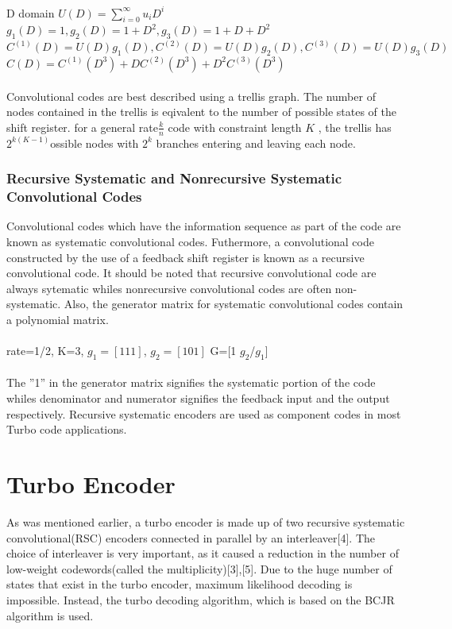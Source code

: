 \documentclass[20 pts]{article}
\begin{document}
\paragraph{}
D domain\newline
$U(D)=\sum_{i=0}^{\infty} u_iD^i $\newline
$g_1(D)=1,g_2(D)=1+D^2,g_3(D)=1+D+D^2$\newline
$C^{(1)}(D)=U(D)g_1(D),C^{(2)}(D)=U(D)g_2(D),C^{(3)}(D)=U(D)g_3(D)$\newline
$C(D)=C^{(1)}(D^3)+DC^{(2)}(D^3)+D^2C^{(3)}(D^3)$
\paragraph{}
Convolutional codes are best described using a trellis graph. The number of nodes contained in the trellis is eqivalent to the number of possible states of the shift register. for a general rate$\frac{k}{n}$ code with constraint length $K$ , the trellis has $2^{k(K-1)}$ossible nodes with $2^k$ branches entering and leaving each node. 
\subsubsection{Recursive Systematic and Nonrecursive Systematic Convolutional Codes}
Convolutional codes which have the information sequence as part of the code are known as systematic convolutional codes. Futhermore, a convolutional code constructed by the use of a feedback shift register is known as a recursive convolutional code. It should be noted that recursive convolutional code are always sytematic whiles nonrecursive convolutional codes are often non-systematic. Also, the generator matrix for systematic convolutional codes contain a polynomial matrix.
\paragraph{}
rate=1/2, K=3, $g_1=[1 1 1]$, $g_2=[1 0 1]$\newline
G=[1 $g_2$/$g_1$]\paragraph{}
The ''1'' in the generator matrix signifies the systematic portion of the code whiles denominator and numerator signifies the feedback input and the output respectively. Recursive systematic encoders are used as component codes in most Turbo code applications.
\section{Turbo Encoder}
As was mentioned earlier, a turbo encoder is made up of two recursive systematic convolutional(RSC) encoders connected in parallel by an interleaver[4]. The choice of interleaver is very important, as it caused a reduction in the  number of low-weight codewords(called the multiplicity)[3],[5]. Due to the huge number of states that exist in the turbo encoder, maximum likelihood decoding is impossible. Instead, the turbo decoding algorithm, which is based on the BCJR algorithm is used.
\end{document}
